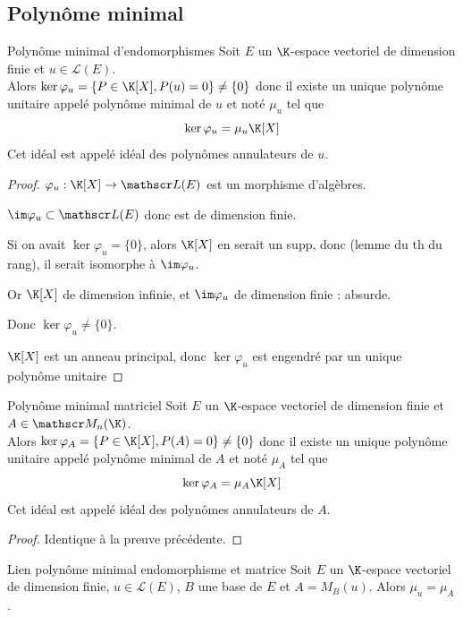 \subsection{Polynôme minimal }

\begin{theoreme}{Polynôme minimal d'endomorphismes}{}
    Soit $E$ un $\K$-espace vectoriel de dimension finie et $u \in \mathscr L(E)$.\\
    Alors $\ker \varphi_u  = \{P \in \K[X], P(u) = 0\} \neq \{0\}$ donc il existe un unique 
    polynôme unitaire appelé polynôme minimal de $u$ et noté $\mu_u$ tel que 
    $$\ker \varphi_u = \mu_u \K[X]$$
    Cet idéal est appelé idéal des polynômes annulateurs de $u$.
\end{theoreme}


\begin{proof}
    $\varphi_u: \K[X] \to \mathscr L(E)$ est un morphisme d'algèbres.

    $\im \varphi_u \subset \mathscr L(E)$ donc est de dimension finie.

    Si on avait $\ker \varphi_u = \{0\}$, alors $\K[X]$ en serait un supp, 
    donc (lemme du th du rang), il serait isomorphe à $\im \varphi_u$.

    Or $\K[X]$ de dimension infinie, et $\im \varphi_u$ de dimension finie : absurde. 

    Donc $\ker \varphi_u \neq \{0\}$.

    $\K[X]$ est un anneau principal, donc $\ker \varphi_u$ est engendré par un unique polynôme unitaire
\end{proof}

\begin{theoreme}{Polynôme minimal matriciel}{}
    Soit $E$ un $\K$-espace vectoriel de dimension finie et $A \in \mathscr M_n(\K)$. \\
    Alors $\ker \varphi_A = \{P \in \K[X], P(A) = 0\} \neq \{0\}$ donc il existe un unique
    polynôme unitaire appelé polynôme minimal de $A$ et noté $\mu_A$ tel que
    $$\ker \varphi_A = \mu_A \K[X]$$
    Cet idéal est appelé idéal des polynômes annulateurs de $A$.
\end{theoreme}

\begin{proof}
    Identique à la preuve précédente.
\end{proof}

\begin{theoreme}{Lien polynôme minimal endomorphisme et matrice}{}
    Soit $E$ un $\K$-espace vectoriel de dimension finie, $u \in \mathscr L(E)$, $B$ une base de $E$ et $A = M_B(u)$.
    Alors $\mu_u = \mu_A$.
\end{theoreme}

